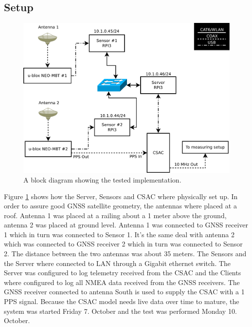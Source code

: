 \documentclass[12pt,english,a4paper]{report}
\begin{document}
\subsection{Setup}
\begin{figure}
\centering
  \includegraphics[scale=0.31]{server_layout.pdf}
   \caption[CSAC SMACC implementation block diagram]{A block diagram showing the tested implementation.}
   \label{ibd}
\end{figure}
Figure \ref{ibd} shows how the Server, Sensors and CSAC where physically set up. In order to assure good GNSS satellite geometry, the antennas where placed at a roof. Antenna 1 was placed at a railing about a 1 meter above the ground, antenna 2 was placed at ground level. Antenna 1 was connected to GNSS receiver 1 which in turn was connected to Sensor 1. It's the same deal with antenna 2 which was connected to GNSS receiver 2 which in turn was connected to Sensor 2. The distance between the two antennas was about 35 meters. The Sensors and the Server where connected to LAN through a Gigabit ethernet switch. The Server was configured to log telemetry received from the CSAC and the Clients where configured to log all NMEA data received from the GNSS receivers. The GNSS receiver connected to antenna South is used to supply the CSAC with a 1 PPS signal. Because the CSAC model needs live data over time to mature, the system was started Friday 7. October and the test was performed Monday 10. October.
\end{document}
